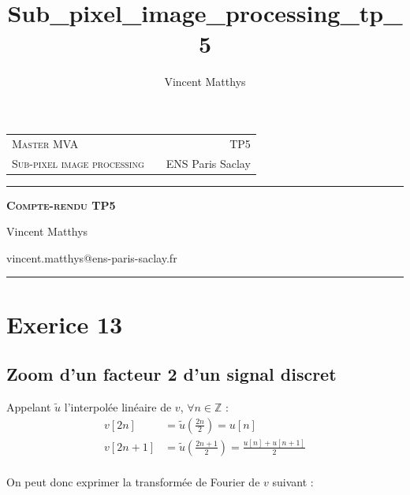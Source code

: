 \documentclass[12pt,a4paper,onecolumn]{article}
\title{Sub_pixel_image_processing_tp_5}
\author{Vincent Matthys}
\begin{document}
\begin{tabularx}{0.9\textwidth}{@{} l X r @{} }
	{\textsc{Master MVA}}               &  & \textsc{TP5}       \\
	\textsc{Sub-pixel image processing} &  & {ENS Paris Saclay} \\
\end{tabularx}
\vspace{1.5cm}
\begin{center}

	\rule[11pt]{5cm}{0.5pt}

	\textbf{\LARGE \textsc{Compte-rendu TP5}}
	\vspace{0.5cm}

	Vincent Matthys

	vincent.matthys@ens-paris-saclay.fr

	\rule{5cm}{0.5pt}

	\vspace{1.5cm}
\end{center}
%
\section{Exerice 13}
\setcounter{subsection}{1}
\subsection{Zoom d'un facteur 2 d'un signal discret}

Appelant \(\tilde{u}\) l'interpolée linéaire de \(v\), \(\forall n \in \mathbb{Z}\) :
\begin{equation}
	\begin{split}
		v[2n] &=  \tilde{u}(\frac{2n}{2}) = u[n]\\
		v[2n + 1] &= \tilde{u}(\frac{2n + 1}{2}) = \frac{u[n] + u[n + 1]}{2}\\
	\end{split}
\end{equation}

On peut donc exprimer la transformée de Fourier de \(v\) suivant :
\end{document}
